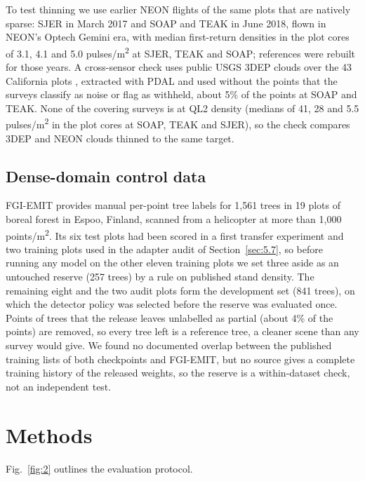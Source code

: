 \documentclass[preprint,12pt,authoryear,a4paper]{elsarticle}
\begin{document}
To test thinning we use earlier NEON flights of the same plots that are natively
sparse: SJER in March 2017 and SOAP and TEAK in June 2018, flown in NEON's
Optech Gemini era, with median first-return densities in the plot cores of 3.1,
4.1 and 5.0 pulses/m\textsuperscript{2} at SJER, TEAK and SOAP; references were rebuilt for those
years. A cross-sensor check uses public USGS 3DEP clouds over the 43 California
plots \citep{usgs2026usgs}, extracted with PDAL \citep{butler2021pdal} and used without
the points that the surveys classify as noise or flag as withheld, about 5\% of
the points at SOAP and TEAK. None of the covering surveys is at QL2 density
(medians of 41, 28 and 5.5 pulses/m\textsuperscript{2} in the plot cores at SOAP, TEAK and SJER),
so the check compares 3DEP and NEON clouds thinned to the same target.

\subsection{Dense-domain control data}\label{sec:3.5}

FGI-EMIT \citep{ruoppa2026benchmarking,ruoppa2026fgiemit} provides manual per-point
tree labels for 1,561 trees in 19 plots of boreal forest in Espoo, Finland,
scanned from a helicopter at more than 1,000 points/m\textsuperscript{2}. Its six test plots had
been scored in a first transfer experiment and two training plots used in the
adapter audit of Section~\ref{sec:5.7}, so before running any model on the other eleven
training plots we set three aside as an untouched reserve (257 trees) by a rule
on published stand density. The remaining eight and the two audit plots form the
development set (841 trees), on which the detector policy was selected before
the reserve was evaluated once. Points of trees that the release leaves
unlabelled as partial (about 4\% of the points) are removed, so every tree left
is a reference tree, a cleaner scene than any survey would give. We found no
documented overlap between the published training lists of both checkpoints and
FGI-EMIT, but no source gives a complete training history of the released
weights, so the reserve is a within-dataset check, not an independent test.

\section{Methods}\label{sec:4}

Fig.~\ref{fig:2} outlines the evaluation protocol.
\end{document}
